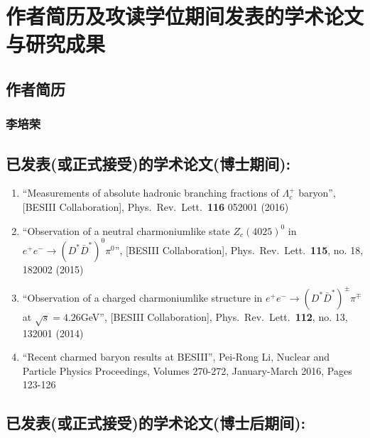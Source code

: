 \chapter{作者简历及攻读学位期间发表的学术论文与研究成果}


\section*{作者简历}

\subsection*{李培荣}

\section*{已发表(或正式接受)的学术论文(博士期间):}

\begin{enumerate}
\item ``Measurements of absolute hadronic branching fractions of $\Lambda_{c}^{+}$ baryon'', [BESIII Collaboration], Phys.\ Rev.\ Lett.\  {\bf 116} 052001 (2016)

\item ``Observation of a neutral charmoniumlike state $Z_c(4025)^0$ in $e^{+} e^{-} \to (D^{*} \bar{D}^{*})^{0} \pi^0$'', [BESIII Collaboration], Phys.\ Rev.\ Lett.\  {\bf 115}, no. 18, 182002 (2015)

\item ``Observation of a charged charmoniumlike structure in $e^+e^- \to (D^{*} \bar{D}^{*})^{\pm} \pi^\mp$ at $\sqrt{s}=4.26$GeV'', [BESIII Collaboration], Phys.\ Rev.\ Lett.\  {\bf 112}, no. 13, 132001 (2014)

\item ``Recent charmed baryon results at BESIII'', Pei-Rong Li, Nuclear and Particle Physics Proceedings, Volumes 270-272, January-March 2016, Pages 123-126

\end{enumerate}

\section*{已发表(或正式接受)的学术论文(博士后期间):}

